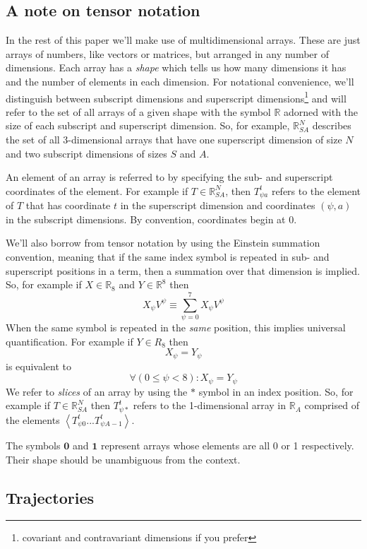 \documentclass{article}
\begin{document}
\subsection{A note on tensor notation}

In the rest of this paper we'll make use of multidimensional arrays. These are just arrays of numbers, like vectors or matrices, but arranged in any number of dimensions. Each array has a \textit{shape} which tells us how many dimensions it has and the number of elements in each dimension. For notational convenience, we'll distinguish between subscript dimensions and superscript dimensions\footnote{covariant and contravariant dimensions if you prefer} and will refer to the set of all arrays of a given shape with the symbol $\mathbb{R}$ adorned with the size of each subscript and superscript dimension.  So, for example, $\mathbb{R}^N_{SA}$ describes the set of all 3-dimensional arrays that have one superscript dimension of size $N$ and two subscript dimensions of sizes $S$ and $A$.

An element of an array is referred to by specifying the sub- and superscript coordinates of the element. For example if $T \in \mathbb{R}^N_{SA}$, then $T^t_{\psi a}$ refers to the element of $T$ that has coordinate $t$ in the superscript dimension and coordinates $(\psi,a)$ in the subscript dimensions. By convention, coordinates begin at 0.

We'll also borrow from tensor notation by using the Einstein summation convention, meaning that if the same index symbol is repeated in sub- and superscript positions in a term, then a summation over that dimension is implied. So, for example if $X \in \mathbb{R}_8$ and $Y \in \mathbb{R}^8$ then
\[
X_\psi V^\psi \equiv \sum_{\psi=0}^7 X_\psi  V^\psi
\]
When the same symbol is repeated in the \textit{same} position, this implies universal quantification. For example if $Y\in R_8$ then
\[
X_\psi = Y_\psi 
\]
is equivalent to
\[
\forall (0 \le \psi < 8) : X_\psi = Y_\psi 
\]
We refer to \textit{slices} of an array by using the $*$ symbol in an index position. So, for example if $T \in \mathbb{R}^N_{SA}$ then $T^t_{\psi *}$ refers to the 1-dimensional array in $\mathbb{R}_A$ comprised of the elements $\left<T^t_{\psi 0}...T^t_{\psi A-1}\right>$.

The symbols $\mathbf{0}$ and $\mathbf{1}$ represent arrays whose elements are all 0 or 1 respectively. Their shape should be unambiguous from the context.

\subsection{Trajectories}
\end{document}
